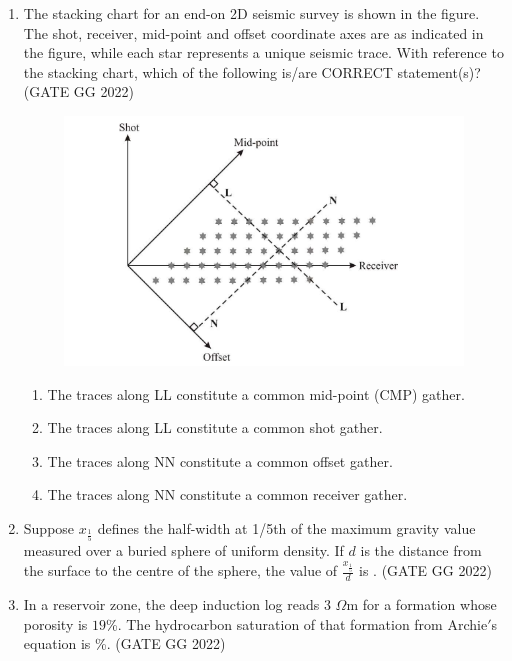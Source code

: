 \documentclass[journal]{IEEEtran}
\begin{document}
\begin{enumerate}
\item  The stacking chart for an end-on 2D seismic survey is shown in the figure. The shot, receiver, mid-point and offset coordinate axes are as indicated in the figure, while each star represents a unique seismic trace. With reference to the stacking chart, which of the following is/are CORRECT statement(s)? 
\hfill(GATE GG 2022)
\begin{figure}[H]
\centering
\includegraphics[width = 0.5\columnwidth]{figs/17.png}
\caption*{}
\label{fig:q5}
\end{figure}
\begin{enumerate}
\item The traces along LL constitute a common mid-point (CMP) gather.  
\item The traces along LL constitute a common shot gather.  
\item The traces along NN constitute a common offset gather.  
\item The traces along NN constitute a common receiver gather.  
\end{enumerate}

 \item Suppose $x_\frac{1}{5}$ defines the half-width at 1/5th of the maximum gravity value measured over a buried sphere of uniform density. If $d$ is the distance from the surface to the centre of the sphere, the value of $
 \frac{x_\frac{1}{5}}{d}$ is \makebox[2cm]{\hrulefill}.  
 \hspace*{15.7cm}(GATE GG 2022)
\vspace{0.5cm}

\item In a reservoir zone, the deep induction log reads $3$ $\Omega$m for a formation whose porosity is $19$\%.  The hydrocarbon saturation of that formation from Archie$'$s equation is \makebox[2cm]{\hrulefill}\%.
\hfill(GATE GG 2022)
\vspace{0.5cm}


\end{enumerate}
\end{document}
